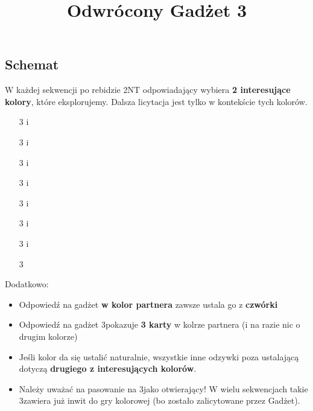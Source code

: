 \documentclass[12pt, a4paper]{article}
\title{\vspace{-2.5cm}Odwrócony Gadżet 3\clubs}
\author{}
\date{}
\begin{document}
\maketitle

\subsection*{Schemat}
W każdej sekwencji po rebidzie 2NT odpowiadający wybiera \textbf{2 interesujące kolory}, które eksplorujemy.
Dalsza licytacja jest tylko w kontekście tych kolorów.

\noindent
\begin{minipage}{.3\textwidth}
    \sequence{{1\clubs}{1\hearts}{2\ntx}}
    \begin{itemize}[align=left, itemindent=4em, labelwidth=3.2em, itemsep=0em]
        \vspace*{-2.3em}
        \item[3\clubs] \hearts i \clubs
        \item[3\diams] \hearts i \diams
        \item[3\hearts] \hearts i \spades \vimp
        \item[3\spades] \hearts i \spades 
    \end{itemize}
\end{minipage}\hspace{2cm}%
\begin{minipage}{.6\textwidth}
    \sequence{{1\clubs}{1\spades}{2\ntx}}
    \begin{itemize}[align=left, itemindent=4em, labelwidth=3.2em, itemsep=0em]
        \vspace*{-2.3em}
        \item[3\clubs] \spades i \clubs
        \item[3\diams] \spades i \diams
        \item[3\hearts] \spades i \hearts
        \item[3\spades] \spades
    \end{itemize}
\end{minipage}
\vspace*{1em}

Dodatkowo:
\begin{itemize}
    \item Odpowiedź na gadżet \textbf{w kolor partnera} zawsze ustala go z \textbf{czwórki}
    \item Odpowiedź na gadżet 3\diams pokazuje \textbf{3 karty} w kolrze partnera (i na razie nic o drugim kolorze)
    \item Jeśli kolor da się ustalić naturalnie, wszystkie inne odzywki poza 
    ustalającą dotyczą \textbf{drugiego z interesujących kolorów}.
    \item Należy uważać na pasowanie na 3\nt jako otwierający! W wielu sekwencjach takie 3\nt zawiera już 
    inwit do gry kolorowej (bo zostało zalicytowane przez Gadżet).
\end{itemize}
\end{document}
